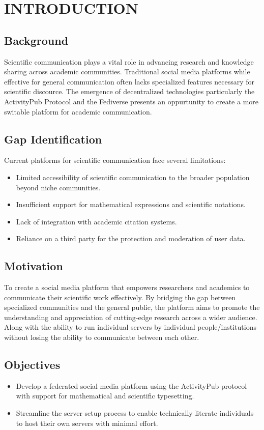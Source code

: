 \chapter{INTRODUCTION}
\section{Background}
Scientific communication plays a vital role in advancing research and knowledge sharing across academic communities. Traditional social media platforms while effective for general communication often lacks specialized features necessary for scientific discource. The emergence of decentralized technologies particularly the ActivityPub \cite{ActivityPub} Protocol and the Fediverse presents an oppurtunity to create a more switable platform for academic communication. 

\section{Gap Identification}
Current platforms for scientific communication face several limitations:

\begin{itemize}
  \item Limited accessibility of scientific communication to the broader population beyond niche communities.
  \item Insufficient support for mathematical expressions and scientific notations.
  \item Lack of integration with academic citation systems.
  \item Reliance on a third party for the protection and moderation of user data.
\end{itemize}

\section{Motivation}
To create a social media platform that empowers researchers and academics to communicate their scientific work effectively. By bridging the gap between specialized communities and the general public, the platform aims to promote the understanding and appreciation of cutting-edge research across a wider audience. Along with the ability to run individual servers by individual people/institutions without losing the ability to communicate between each other.

\section{Objectives}
\begin{itemize}
  \item Develop a federated social media platform using the ActivityPub protocol with support for mathematical and scientific typesetting.
  \item Streamline the server setup process to enable technically literate individuals to host their own servers with minimal effort.
\end{itemize}
